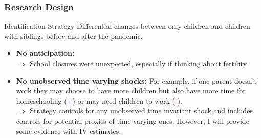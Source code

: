 \documentclass{beamer}
\begin{document}
\begin{frame}
    \label{frame:research}
    \frametitle{Research Design}
    
    \begin{block}{Identification Strategy}
    Differential changes between only children and children with siblings before and after the pandemic.
    \end{block}
    
    \begin{itemize}
         \item<2-> \textbf{No anticipation:} \\
         $\Rightarrow$ School closures were unexpected, especially if thinking about fertility
         \item<3-> \textbf{No unobserved time varying shocks:} For example, if one parent doesn't work they may choose to have more children but also have more time for homeschooling (\textcolor{blue}{+}) or may need children to work (\textcolor{red}{-}). \\
         $\Rightarrow$ Strategy controls for any unobserved time invariant shock and includes controls for potential proxies of time varying ones. However, I will provide some evidence with IV estimates.
    \end{itemize}
\end{frame}
\end{document}
